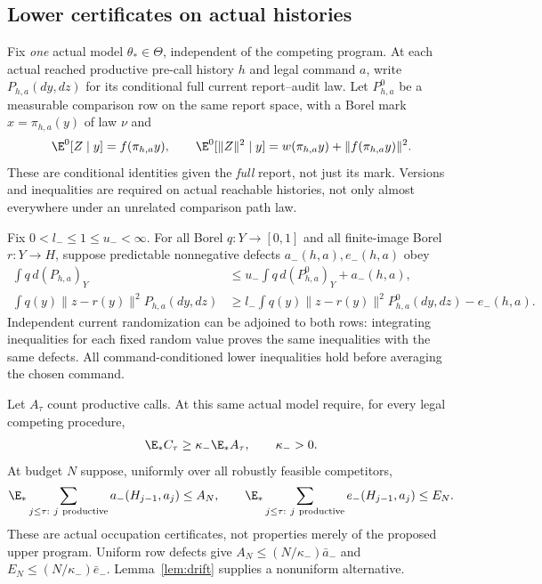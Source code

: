 \subsection*{Lower certificates on actual histories}\label{sec:lower-cert}
Fix \emph{one} actual model $\theta_*\in\Theta$, independent of the competing program. At each actual reached productive pre-call history $h$ and legal command $a$, write $P_{h,a}(dy,dz)$ for its conditional full current report--audit law. Let $P^0_{h,a}$ be a measurable comparison row on the same report space, with a Borel mark $x=\pi_{h,a}(y)$ of law $\nu$ and
\begin{equation}\label{eq:full-moments}
 \E^0[Z\mid y]=f(\pi_{h,a}y),\qquad
 \E^0[\|Z\|^2\mid y]=w(\pi_{h,a}y)+\|f(\pi_{h,a}y)\|^2.
\end{equation}
These are conditional identities given the \emph{full} report, not just its mark. Versions and inequalities are required on actual reachable histories, not only almost everywhere under an unrelated comparison path law.

Fix $0<l_-\le1\le u_-<\infty$. For all Borel $q:Y\to[0,1]$ and all finite-image Borel $r:Y\to H$, suppose predictable nonnegative defects $a_-(h,a),e_-(h,a)$ obey
\begin{align}
 \int q\,d(P_{h,a})_Y
 &\le u_-\int q\,d(P^0_{h,a})_Y+a_-(h,a),\label{eq:lower-mass}\\
 \int q(y)\|z-r(y)\|^2P_{h,a}(dy,dz)
 &\ge l_-\int q(y)\|z-r(y)\|^2P^0_{h,a}(dy,dz)-e_-(h,a).
 \label{eq:lower-task}
\end{align}
Independent current randomization can be adjoined to both rows: integrating inequalities for each fixed random value proves the same inequalities with the same defects. All command-conditioned lower inequalities hold before averaging the chosen command.

Let $A_\tau$ count productive calls. At this same actual model require, for every legal competing procedure,
\begin{equation}\label{eq:effort}
 \E_* C_\tau\ge\kappa_-\E_* A_\tau,\qquad\kappa_->0.
\end{equation}
At budget $N$ suppose, uniformly over all robustly feasible competitors,
\begin{equation}\label{eq:occupation}
 \E_*\sum_{j\le\tau:\ j\ {\rm productive}}a_-(H_{j-1},a_j)\le A_N,
 \qquad
 \E_*\sum_{j\le\tau:\ j\ {\rm productive}}e_-(H_{j-1},a_j)\le E_N.
\end{equation}
These are actual occupation certificates, not properties merely of the proposed upper program. Uniform row defects give $A_N\le(N/\kappa_-)\bar a_-$ and $E_N\le(N/\kappa_-)\bar e_-$. Lemma~\ref{lem:drift} supplies a nonuniform alternative.

